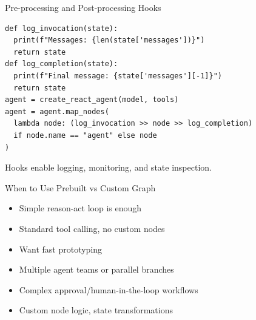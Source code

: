 \documentclass[aspectratio=169,11pt]{beamer}
\begin{document}
\begin{frame}[fragile]{Pre-processing and Post-processing Hooks}
  \begin{codebox}
    \begin{lstlisting}
def log_invocation(state):
  print(f"Messages: {len(state['messages'])}")
  return state
def log_completion(state):
  print(f"Final message: {state['messages'][-1]}")
  return state
agent = create_react_agent(model, tools)
agent = agent.map_nodes(
  lambda node: (log_invocation >> node >> log_completion)
  if node.name == "agent" else node
)
    \end{lstlisting}
  \end{codebox}
  \vspace{0.1cm}
  \begin{tipbox}
    Hooks enable logging, monitoring, and state inspection.
  \end{tipbox}
\end{frame}

\begin{frame}{When to Use Prebuilt vs Custom Graph}
  \begin{conceptbox}
    \setlength{\itemsep}{1pt}
    \begin{itemize}
      \item Simple reason-act loop is enough
      \item Standard tool calling, no custom nodes
      \item Want fast prototyping
    \end{itemize}
  \end{conceptbox}
  \vspace{0.1cm}
  \begin{warningbox}
    \setlength{\itemsep}{1pt}
    \begin{itemize}
      \item Multiple agent teams or parallel branches
      \item Complex approval/human-in-the-loop workflows
      \item Custom node logic, state transformations
    \end{itemize}
  \end{warningbox}
\end{frame}
\end{document}
